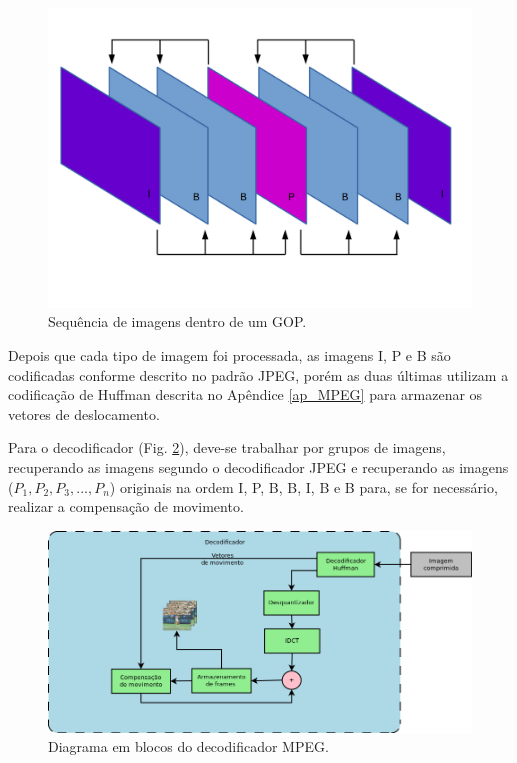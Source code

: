 \begin{figure}[!ht]
\begin{center}
\includegraphics[scale=0.4]{./Figures/png/image_seq.png}
\caption{Sequência de imagens dentro de um GOP.}
\label{fig:image_seq}
\end{center}
\end{figure}

Depois que cada tipo de imagem foi processada, as imagens I, P e B são codificadas conforme descrito no padrão JPEG, porém as duas últimas utilizam a codificação de Huffman descrita no Apêndice \ref{ap_MPEG} para armazenar os vetores de deslocamento.

Para o decodificador (Fig. \ref{fig:mpeg_dec}), deve-se trabalhar por grupos de imagens, recuperando as imagens segundo o decodificador JPEG e recuperando as imagens ($P_1,P_2,P_3,...,P_n$) originais na ordem I, P, B, B, I, B e B para, se for necessário, realizar a compensação de movimento.

\begin{figure}[!ht]
\begin{center}
\includegraphics[scale=0.4]{./Figures/png/mpeg_decoder.png}
\caption{Diagrama em blocos do decodificador MPEG.}
\label{fig:mpeg_dec}
\end{center}
\end{figure}